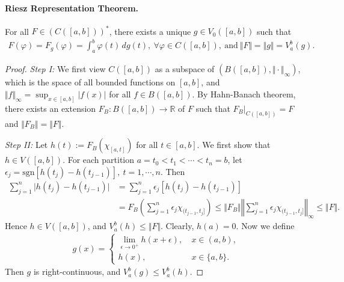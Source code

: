 \documentclass{article}
\begin{document}
\paragraph{Riesz Representation Theorem.} For all $F\in(C([a,b]))^*$, there exists a unique $g\in V_0([a,b])$ such that
\begin{align*}
	F(\varphi) = F_g(\varphi) = \int_a^b \varphi(t)\,dg(t),\ \forall \varphi\in C([a,b]),\ \text{and}\ \Vert F\Vert = \Vert g\Vert = V_a^b(g).
\end{align*}
\begin{proof}
\textit{Step I:} We first view $C([a,b])$ as a subspace of $(B([a,b]),\Vert\cdot\Vert_\infty)$, which is the space of all bounded functions on $[a,b]$, and $\Vert f\Vert_\infty = \sup_{x\in[a,b]}\vert f(x)\vert$ for all $f\in B([a,b])$. By Hahn-Banach theorem, there exists an extension $F_B:B([a,b])\to\mathbb{R}$ of $F$ such that $F_B|_{C([a,b])}=F$ and $\Vert F_B\Vert = \Vert F\Vert$.
\vspace{0.15cm}

\textit{Step II:} Let $h(t):=F_B(\chi_{[a,t]})$ for all $t\in[a,b]$. We first show that $h\in V([a,b])$. For each partition $a=t_0<t_1<\cdots<t_n=b$, let $\epsilon_j=\mathrm{sgn}\left[h(t_j)-h(t_{j-1})\right],\ t=1,\cdots,n$. Then
\begin{align*}
	\sum_{j=1}^n\vert h(t_j)-h(t_{j-1})\vert &= \sum_{j=1}^n\epsilon_j\left[h(t_j)-h(t_{j-1})\right]\\ 
	&= F_B\left(\sum_{j=1}^n\epsilon_j\chi_{(t_{j-1},t_j]}\right)\leq \Vert F_B\Vert\left\Vert\sum_{j=1}^n\epsilon_j\chi_{(t_{j-1},t_j]}\right\Vert_\infty \leq \Vert F\Vert.
\end{align*}
Hence $h\in V([a,b])$, and $V_a^b(h)\leq \Vert F\Vert$. Clearly, $h(a)=0$. Now we define
\begin{align*}
	g(x) =\begin{cases}
		\lim_{\epsilon\to 0^+}h(x+\epsilon),\ &x\in(a,b),\\
		h(x),\ &x\in\{a,b\}.
	\end{cases} 
\end{align*}
Then $g$ is right-continuous, and $V_a^b(g)\leq V_a^b(h)$.
\vspace{0.15cm}


\end{proof}
\end{document}
